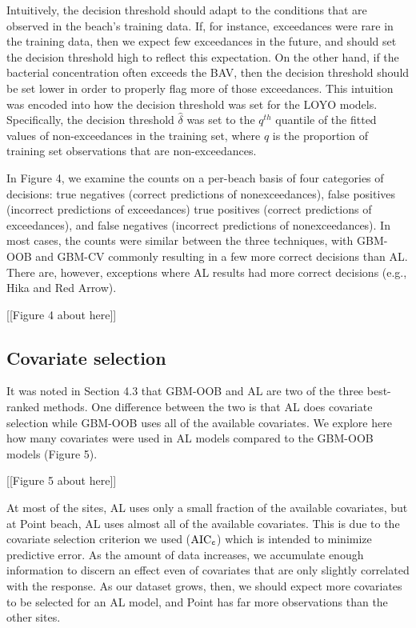 \documentclass[authoryear,review, 12pt]{elsarticle}
\begin{document}
Intuitively, the decision threshold should adapt to the conditions that
are observed in the beach's training data. If, for instance, exceedances
were rare in the training data, then we expect few exceedances in the
future, and should set the decision threshold high to reflect this
expectation. On the other hand, if the bacterial concentration often
exceeds the BAV, then the decision threshold should be set lower in
order to properly flag more of those exceedances. This intuition was
encoded into how the decision threshold was set for the LOYO models.
Specifically, the decision threshold \(\hat{\delta}\) was set to the
\(q^{th}\) quantile of the fitted values of non-exceedances in the
training set, where \(q\) is the proportion of training set observations
that are non-exceedances.

In Figure 4, we examine the counts on a per-beach basis of four
categories of decisions: true negatives (correct predictions of
nonexceedances), false positives (incorrect predictions of exceedances)
true positives (correct predictions of exceedances), and false negatives
(incorrect predictions of nonexceedances). In most cases, the counts
were similar between the three techniques, with GBM-OOB and GBM-CV
commonly resulting in a few more correct decisions than AL. There are,
however, exceptions where AL results had more correct decisions (e.g.,
Hika and Red Arrow).

[[Figure 4 about here]]

\subsection{Covariate selection}\label{covariate-selection}

It was noted in Section 4.3 that GBM-OOB and AL are two of the three
best-ranked methods. One difference between the two is that AL does
covariate selection while GBM-OOB uses all of the available covariates.
We explore here how many covariates were used in AL models compared to
the GBM-OOB models (Figure 5).

[[Figure 5 about here]]

At most of the sites, AL uses only a small fraction of the available
covariates, but at Point beach, AL uses almost all of the available
covariates. This is due to the covariate selection criterion we used
(\(\text{AIC}_{\tt c}\)) which is intended to minimize predictive error.
As the amount of data increases, we accumulate enough information to
discern an effect even of covariates that are only slightly correlated
with the response. As our dataset grows, then, we should expect more
covariates to be selected for an AL model, and Point has far more
observations than the other sites.
\end{document}
